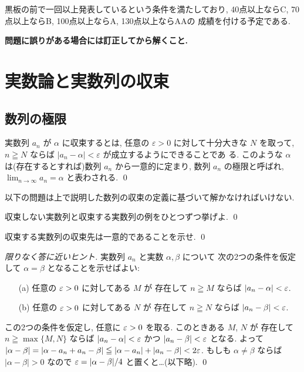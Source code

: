 \documentclass[12pt,twoside]{jarticle}
\begin{document}
黒板の前で一回以上発表しているという条件を満たしており, 
40点以上ならC, 70点以上ならB, 100点以上ならA, 130点以上ならAAの
成績を付ける予定である.

\bigskip
{\bf\large 問題に誤りがある場合には訂正してから解くこと.}


\section{実数論と実数列の収束}


\subsection{数列の極限}

\begin{definition}[数列の極限]
  実数列 $a_n$ が $\alpha$ に収束するとは, 
  任意の $\varepsilon > 0$ に対して十分大きな $N$ を取って, $n \geqq N$ 
  ならば $|a_n - \alpha| < \varepsilon$ が成立するようにできることであ
  る. このような $\alpha$ は(存在するとすれば)数列 $a_n$ から一意的に定まり, 
  数列 $a_n$ の極限と呼ばれ, 
  $\displaystyle\lim_{n\to\infty}a_n=\alpha$ と表わされる.
  \qed
\end{definition}

以下の問題は上で説明した数列の収束の定義に基づいて解かなければいけない.

\begin{question}[簡単]
 収束しない実数列と収束する実数列の例をひとつずつ挙げよ. \qed
\end{question}

\begin{question}
 収束する実数列の収束先は一意的であることを示せ. \qed
\end{question}

\begin{proof}[限りなく答に近いヒント]
 実数列 $a_n$ と実数 $\alpha,\beta$ について
 次の2つの条件を仮定して $\alpha=\beta$ となることを示せばよい:
 \begin{enumerate}
  \item[(a)] 任意の $\varepsilon>0$ に対してある $M$ が
   存在して $n\geqq M$ ならば $|a_n-\alpha| <     \varepsilon$.
  \item[(b)] 任意の $\varepsilon>0$ に対してある $N$ が
   存在して $n\geqq N$ ならば $|a_n-\beta|  <     \varepsilon$.
 \end{enumerate}
 この2つの条件を仮定し, 任意に $\varepsilon>0$ を取る.
 このときある $M$, $N$ が
 存在して $n\geqq\max\{M,N\}$ 
 ならば $|a_n-\alpha|<\varepsilon$ かつ $|a_n-\beta|<\varepsilon$ となる.
 よって $|\alpha-\beta|=|\alpha-a_n+a_n-\beta|\leqq|\alpha-a_n|+|a_n-\beta|<2\varepsilon$.
 もしも $\alpha\ne\beta$ ならば $|\alpha-\beta|>0$ なので $\varepsilon=|\alpha-\beta|/4$ 
 と置くと…(以下略).
 \qed
\end{proof}
\end{document}

